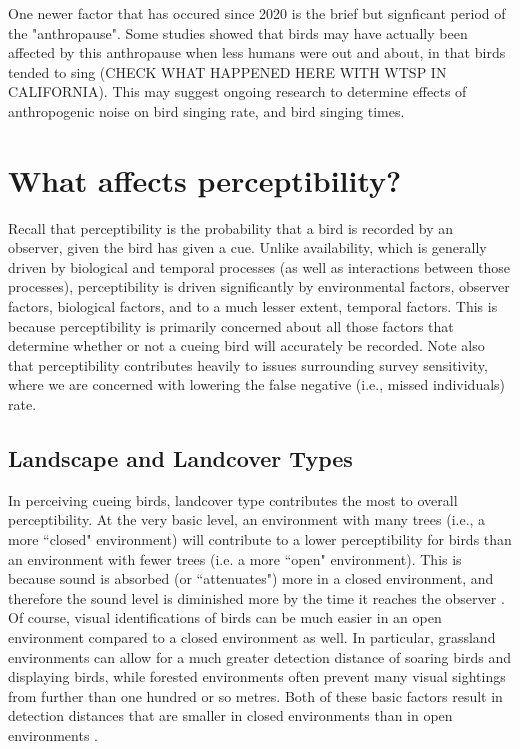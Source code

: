 \par One newer factor that has occured since 2020 is the brief but signficant period of the "anthropause".
Some studies showed that birds may have actually been affected by this anthropause when less humans were out and about, in that birds tended to sing (CHECK WHAT HAPPENED HERE WITH WTSP IN CALIFORNIA).
This may suggest ongoing research to determine effects of anthropogenic noise on bird singing rate, and bird singing times.

\section{What affects perceptibility?}

\par Recall that perceptibility is the probability that a bird is recorded by an observer, given the bird has given a cue.
Unlike availability, which is generally driven by biological and temporal processes (as well as interactions between those processes), perceptibility is driven significantly by environmental factors, observer factors, biological factors, and to a much lesser extent, temporal factors.
This is because perceptibility is primarily concerned about all those factors that determine whether or not a cueing bird will accurately be recorded.
Note also that perceptibility contributes heavily to issues surrounding survey sensitivity, where we are concerned with lowering the false negative (i.e., missed individuals) rate.

\subsection{Landscape and Landcover Types}

\par In perceiving cueing birds, landcover type contributes the most to overall perceptibility.
At the very basic level, an environment with many trees (i.e., a more ``closed" environment) will contribute to a lower perceptibility for birds than an environment with fewer trees (i.e. a more ``open" environment).
This is because sound is absorbed (or ``attenuates") more in a closed environment, and therefore the sound level is diminished more by the time it reaches the observer \citep{yip_sound_2017}.
Of course, visual identifications of birds can be much easier in an open environment compared to a closed environment as well.
In particular, grassland environments can allow for a much greater detection distance of soaring birds and displaying birds, while forested environments often prevent many visual sightings from further than one hundred or so metres.
Both of these basic factors result in detection distances that are smaller in closed environments than in open environments \citep{edwards_point_2023, solymos_calibrating_2013, yip_sound_2017}.

